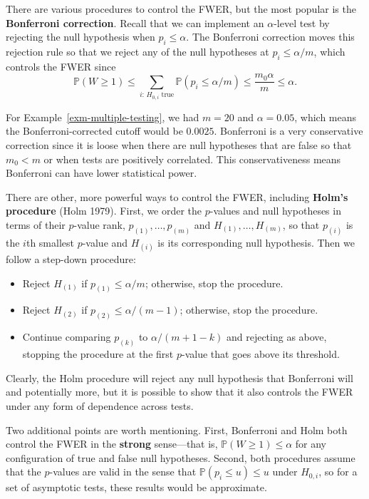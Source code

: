 \documentclass[
  13pt,
  letterpaper,
  DIV=11,
  numbers=noendperiod]{scrreprt}
\providecommand{\tightlist}{%
  \setlength{\itemsep}{0pt}\setlength{\parskip}{0pt}}
\renewcommand{\P}{\mathbb{P}}
\theoremstyle{plain}
\theoremstyle{plain}
\theoremstyle{definition}
\theoremstyle{definition}
\theoremstyle{remark}
\begin{document}
There are various procedures to control the FWER, but the most popular
is the \textbf{Bonferroni correction}. Recall that we can implement an
\(\alpha\)-level test by rejecting the null hypothesis when
\(p_i \leq \alpha\). The Bonferroni correction moves this rejection rule
so that we reject any of the null hypotheses at \(p_i \leq \alpha / m\),
which controls the FWER since
\[\P(W\ge1)\le\sum_{i:\,H_{0,i}\text{ true}}\P(p_i\le\alpha/m)\le \frac{m_0\alpha}{m}\le\alpha.\]

For Example~\ref{exm-multiple-testing}, we had \(m=20\) and
\(\alpha = 0.05\), which means the Bonferroni-corrected cutoff would be
\(0.0025\). Bonferroni is a very conservative correction since it is
loose when there are null hypotheses that are false so that \(m_0 < m\)
or when tests are positively correlated. This conservativeness means
Bonferroni can have lower statistical power.

There are other, more powerful ways to control the FWER, including
\textbf{Holm's procedure} (Holm 1979). First, we order the \(p\)-values
and null hypotheses in terms of their \(p\)-value rank,
\(p_{(1)}, \ldots, p_{(m)}\) and \(H_{(1)}, \ldots, H_{(m)}\), so that
\(p_{(i)}\) is the \(i\)th smallest \(p\)-value and \(H_{(i)}\) is its
corresponding null hypothesis. Then we follow a step-down procedure:

\begin{itemize}
\tightlist
\item
  Reject \(H_{(1)}\) if \(p_{(1)} \leq \alpha / m\); otherwise, stop the
  procedure.
\item
  Reject \(H_{(2)}\) if \(p_{(2)} \leq \alpha / (m - 1)\); otherwise,
  stop the procedure.
\item
  Continue comparing \(p_{(k)}\) to \(\alpha / (m + 1 - k)\) and
  rejecting as above, stopping the procedure at the first \(p\)-value
  that goes above its threshold.
\end{itemize}

Clearly, the Holm procedure will reject any null hypothesis that
Bonferroni will and potentially more, but it is possible to show that it
also controls the FWER under any form of dependence across tests.

Two additional points are worth mentioning. First, Bonferroni and Holm
both control the FWER in the \textbf{strong} sense---that is,
\(\P(W \geq 1) \leq \alpha\) for any configuration of true and false
null hypotheses. Second, both procedures assume that the \(p\)-values
are valid in the sense that \(\P(p_i \leq u)\leq u\) under \(H_{0,i}\),
so for a set of asymptotic tests, these results would be approximate.
\end{document}
